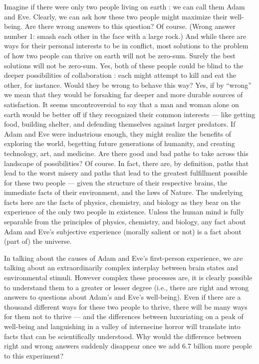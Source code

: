 \documentclass[a4paper,14pt]{extbook}
\begin{document}
Imagine if there were only two people living on earth :
we can call them Adam and Eve.
Clearly, we can ask how these two people might maximize their well-being.
Are there wrong answers to this question?
Of course.
(Wrong answer number 1: smash each other in the face with a large rock.)
And while there are ways for their personal interests to be in conflict, most solutions to the problem of how two people can thrive on earth will not be zero-sum.
Surely the best solutions will not be zero-sum.
Yes, both of these people could be blind to the deeper possibilities of collaboration :
each might attempt to kill and eat the other, for instance.
Would they be wrong to behave this way?
Yes, if by ``wrong'' we mean that they would be forsaking far deeper and more durable sources of satisfaction.
It seems uncontroversial to say that a man and woman alone on earth would be better off if they recognized their common interests --- like getting food, building shelter, and defending themselves against larger predators.
If Adam and Eve were industrious enough, they might realize the benefits of exploring the world, begetting future generations of humanity, and creating technology, art, and medicine.
Are there good and bad paths to take across this landscape of possibilities?
Of course. In fact, there are, by definition, paths that lead to the worst misery and paths that lead to the greatest fulfillment possible for these two people --- given the structure of their respective brains, the immediate facts of their environment, and the laws of Nature.
The underlying facts here are the facts of physics, chemistry, and biology as they bear on the experience of the only two people in existence.
Unless the human mind is fully separable from the principles of physics, chemistry, and biology, any fact about Adam and Eve's subjective experience (morally salient or not) is a fact about (part of) the universe.

In talking about the causes of Adam and Eve's first-person experience, we are talking about an extraordinarily complex interplay between brain states and environmental stimuli.
However complex these processes are, it is clearly possible to understand them to a greater or lesser degree (i.e., there are right and wrong answers to questions about Adam's and Eve's well-being).
Even if there are a thousand different ways for these two people to thrive, there will be many ways for them not to thrive --- and the differences between luxuriating on a peak of well-being and languishing in a valley of internecine horror will translate into facts that can be scientifically understood.
Why would the difference between right and wrong answers suddenly disappear once we add 6.7 billion more people to this experiment?
\end{document}
